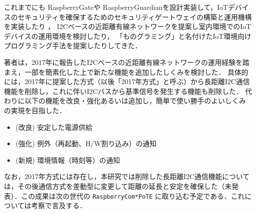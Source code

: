これまでにも RaspberryGateや RaspberryGuardianを設計実装して，IoTデバイスのセキュリティを確保するためのセキュリティゲートウェイの構築と運用機構を実装したり\cite{hohno:RaspberryGate}\cite{hohno:RaspberryGuardian} ，
I2Cベースの近距離有線ネットワークを提案し室内環境でのIoTデバイスの運用環境を検討したり\cite{hohno:I2CwiredLAN-2017}，
「ものグラミング」と名付けたIoT環境向けプログラミング手法を提案したりしてきた\cite{hohno:monogramming2}．

著者は，2017年に報告したI2Cベースの近距離有線ネットワークの運用経験を踏まえ，一部を簡素化した上で新たな機能を追加したしくみを検討した．
具体的には，2017年に提案した方式（以後「2017年方式」と呼ぶ）から長距離I2C通信機能を削除し，これに伴いI2Cバスから基準信号を発生する機能も削除した．
代わりに以下の機能を改良・強化あるいは追加し，簡単で使い勝手のよいしくみの実現を目指した．

\begin{itemize}
\item (改良) 安定した電源供給
\item (強化) 例外（再起動、H/W割り込み）の通知
\item (新規) 環境情報（時刻等）の通知
\end{itemize}

なお，2017年方式には存在し，本研究では削除した長距離I2C通信機能については，その後通信方式を差動型に変更して距離の延長と安定を確保した（未発表）．この成果は次の世代の {\tt Raspberry\-Com*PoTE} に取り込む予定である．これについては考察で言及する．





